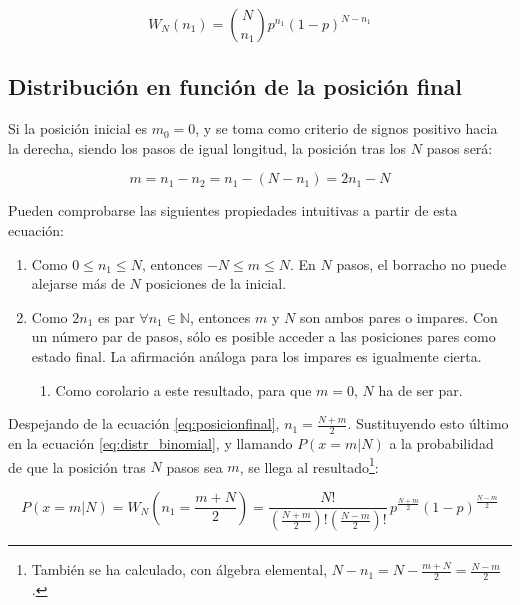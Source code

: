\begin{equation}
	W_N(n_1) = \binom{N}{n_1} p^{n_1} (1-p)^{N-n_1}
	\label{eq:distr_binomial}
\end{equation}

\subsection{Distribución en función de la posición final}
\label{sec:a_posicion}

Si la posición inicial es $m_0 = 0$, y se toma como criterio de signos positivo hacia la derecha, siendo los pasos de igual longitud, la posición tras los $N$ pasos será:

\begin{equation}
	m = n_1 - n_2 = n_1 - (N - n_1) = 2n_1 - N
	\label{eq:posicionfinal}
\end{equation}

Pueden comprobarse las siguientes propiedades intuitivas a partir de esta ecuación:

\begin{enumerate}
	\item Como $0 \leq n_1 \leq N$, entonces $- N \leq m \leq N$. En $N$ pasos, el borracho no puede alejarse más de $N$ posiciones de la inicial.
	\item Como $2n_1$ es par $\forall n_1 \in \mathbb N$, entonces $m$ y $N$ son ambos pares o impares. Con un número par de pasos, sólo es posible acceder a las posiciones pares como estado final. La afirmación análoga para los impares es igualmente cierta.
	\begin{enumerate}
		\item Como corolario a este resultado, para que $m = 0$, $N$ ha de ser par.
	\end{enumerate}
\end{enumerate}

Despejando de la ecuación \ref{eq:posicionfinal}, $n_1 = \frac{N+m}{2}$.  Sustituyendo esto último en la ecuación \ref{eq:distr_binomial}, y llamando $P\left(x = m | N\right)$ a la probabilidad de que la posición tras $N$ pasos sea $m$, se llega al resultado\footnote{También se ha calculado, con álgebra elemental, $N - n_1 = N - \frac{m+N}{2} = \frac{N-m}{2}$.}:

\begin{equation}
	P(x=m | N) = W_N\left(n_1 = \frac{m+N}{2}\right) = \frac{N!}{\left(\frac{N+m}{2} \right)! \left(\frac{N-m}{2} \right)!} \,p^{\frac{N+m}{2}} (1-p)^{\frac{N-m}{2}}
	\label{eq:prob_posfinal}
\end{equation}

